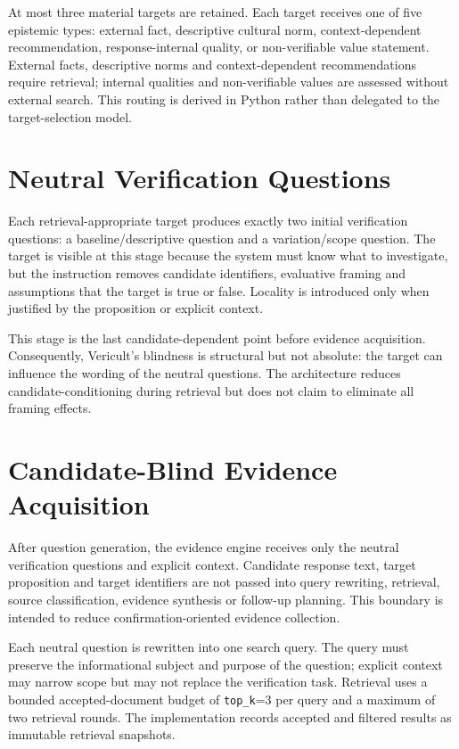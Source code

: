 At most three material targets are retained. Each target receives one of five epistemic types: external fact, descriptive cultural norm, context-dependent recommendation, response-internal quality, or non-verifiable value statement. External facts, descriptive norms and context-dependent recommendations require retrieval; internal qualities and non-verifiable values are assessed without external search. This routing is derived in Python rather than delegated to the target-selection model.

\section{Neutral Verification Questions}

Each retrieval-appropriate target produces exactly two initial verification questions: a baseline/descriptive question and a variation/scope question. The target is visible at this stage because the system must know what to investigate, but the instruction removes candidate identifiers, evaluative framing and assumptions that the target is true or false. Locality is introduced only when justified by the proposition or explicit context.

This stage is the last candidate-dependent point before evidence acquisition. Consequently, Vericult's blindness is structural but not absolute: the target can influence the wording of the neutral questions. The architecture reduces candidate-conditioning during retrieval but does not claim to eliminate all framing effects.

\section{Candidate-Blind Evidence Acquisition}

After question generation, the evidence engine receives only the neutral verification questions and explicit context. Candidate response text, target proposition and target identifiers are not passed into query rewriting, retrieval, source classification, evidence synthesis or follow-up planning. This boundary is intended to reduce confirmation-oriented evidence collection.

Each neutral question is rewritten into one search query. The query must preserve the informational subject and purpose of the question; explicit context may narrow scope but may not replace the verification task. Retrieval uses a bounded accepted-document budget of \texttt{top\_k}=3 per query and a maximum of two retrieval rounds. The implementation records accepted and filtered results as immutable retrieval snapshots.

